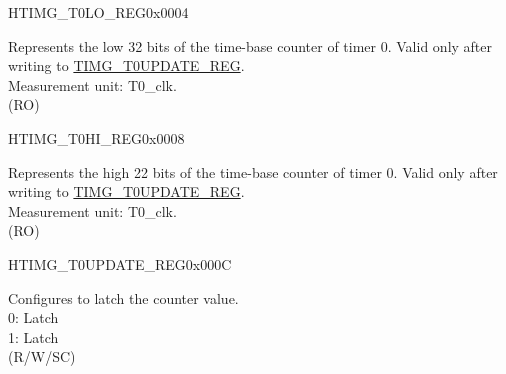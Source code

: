 \begin{register}{H}{TIMG\_T0LO\_REG}{0x0004}\label{regdesc:TIMGTXLOREG}
%
\regnewline%
\begin{regdesc}\begin{reglist}
\label{fielddesc:TIMGTXLO}\item [TIMG\_T0\_LO] Represents the low 32 bits of the time-base counter of timer 0. Valid only after writing to \hyperref[regdesc:TIMGTXUPDATEREG]{TIMG\_T0UPDATE\_REG}. \\
Measurement unit: T0\_clk. \\
(RO)
\end{reglist}\end{regdesc}
\end{register}


\begin{register}{H}{TIMG\_T0HI\_REG}{0x0008}\label{regdesc:TIMGTXHIREG}
%
%
\regnewline%
\begin{regdesc}\begin{reglist}
\label{fielddesc:TIMGTXHI}\item [TIMG\_T0\_HI] Represents the high 22 bits of the time-base counter of timer 0. Valid only after writing to \hyperref[regdesc:TIMGTXUPDATEREG]{TIMG\_T0UPDATE\_REG}. \\
Measurement unit: T0\_clk. \\
(RO)
\end{reglist}\end{regdesc}
\end{register}


\begin{register}{H}{TIMG\_T0UPDATE\_REG}{0x000C}\label{regdesc:TIMGTXUPDATEREG}
%
%
\regnewline%
\begin{regdesc}\begin{reglist}
\label{fielddesc:TIMGTXUPDATE}\item [TIMG\_T0\_UPDATE] Configures to latch the counter value. \\
0: Latch \\
1: Latch \\
(R/W/SC)
\end{reglist}\end{regdesc}
\end{register}


